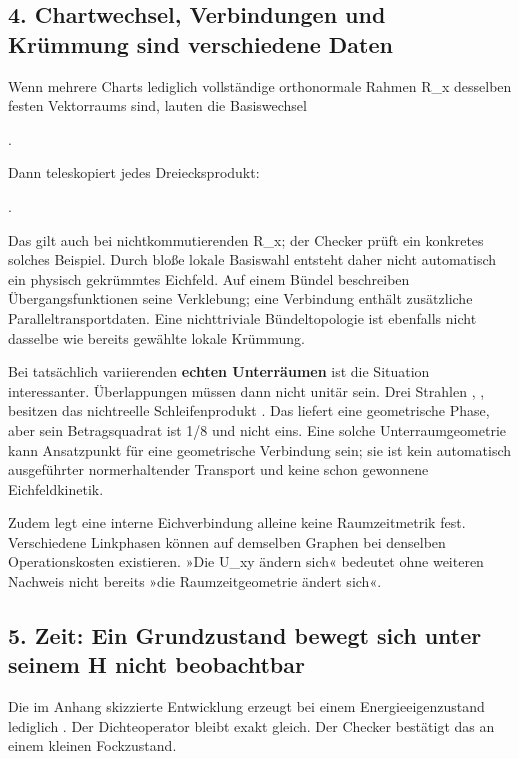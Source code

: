 \subsection{4. Chartwechsel, Verbindungen und Krümmung sind verschiedene
Daten}\label{chartwechsel-verbindungen-und-kruxfcmmung-sind-verschiedene-daten}

Wenn mehrere Charts lediglich vollständige orthonormale Rahmen R\_x
desselben festen Vektorraums sind, lauten die Basiswechsel

.

Dann teleskopiert jedes Dreiecksprodukt:

.

Das gilt auch bei nichtkommutierenden R\_x; der Checker prüft ein
konkretes solches Beispiel. Durch bloße lokale Basiswahl entsteht daher
nicht automatisch ein physisch gekrümmtes Eichfeld. Auf einem Bündel
beschreiben Übergangsfunktionen seine Verklebung; eine Verbindung
enthält zusätzliche Paralleltransportdaten. Eine nichttriviale
Bündeltopologie ist ebenfalls nicht dasselbe wie bereits gewählte lokale
Krümmung.

Bei tatsächlich variierenden \textbf{echten Unterräumen} ist die
Situation interessanter. Überlappungen  müssen dann
nicht unitär sein. Drei Strahlen , ,
 besitzen das nichtreelle Schleifenprodukt
. Das liefert eine geometrische Phase, aber sein
Betragsquadrat ist 1/8 und nicht eins. Eine solche Unterraumgeometrie
kann Ansatzpunkt für eine geometrische Verbindung sein; sie ist kein
automatisch ausgeführter normerhaltender Transport und keine schon
gewonnene Eichfeldkinetik.

Zudem legt eine interne Eichverbindung alleine keine Raumzeitmetrik
fest. Verschiedene Linkphasen können auf demselben Graphen bei denselben
Operationskosten existieren. »Die U\_xy ändern sich« bedeutet ohne
weiteren Nachweis nicht bereits »die Raumzeitgeometrie ändert sich«.

\subsection{5. Zeit: Ein Grundzustand bewegt sich unter seinem H nicht
beobachtbar}\label{zeit-ein-grundzustand-bewegt-sich-unter-seinem-h-nicht-beobachtbar}

Die im Anhang skizzierte Entwicklung  erzeugt
bei einem Energieeigenzustand lediglich . Der
Dichteoperator bleibt exakt gleich. Der Checker bestätigt das an einem
kleinen Fockzustand.


